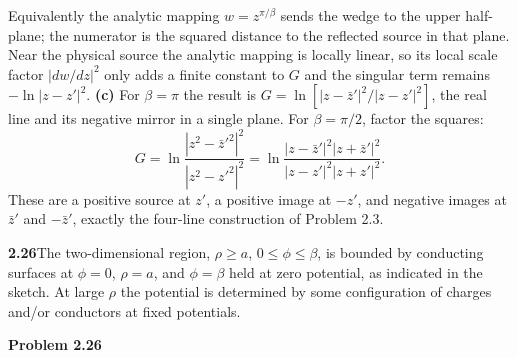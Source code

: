 Equivalently the analytic mapping $w=z^{\pi/\beta}$ sends the wedge
to the upper half-plane; the numerator is the squared distance to
the reflected source in that plane. Near the physical source the
analytic mapping is locally linear, so its local scale factor
$|dw/dz|^2$ only adds a finite constant to $G$ and the singular term
remains $-\ln|z-z'|^2$.
\textbf{(c)} For $\beta=\pi$ the result is
$G=\ln[|z-\bar z'|^2/|z-z'|^2]$, the real line and its negative
mirror in a single plane. For $\beta=\pi/2$, factor the squares:
\[
G=\ln\frac{|z^2-\bar z'^2|^2}{|z^2-z'^2|^2}
 =\ln\frac{|z-\bar z'|^2|z+\bar z'|^2}
              {|z-z'|^2|z+z'|^2}.
\]
These are a positive source at $z'$, a positive image at $-z'$,
and negative images at $\bar z'$ and $-\bar z'$, exactly the
four-line construction of Problem 2.3.

\par\bigskip
\noindent\textbf{2.26}\quad The two-dimensional region, $\rho\geq a$, $0\leq\phi\leq\beta$, is bounded by conducting surfaces at $\phi=0$, $\rho=a$, and $\phi=\beta$ held at zero potential, as indicated in the sketch. At large $\rho$ the potential is determined by some configuration of charges and/or conductors at fixed potentials.

\begin{center}
\par\vspace{0.5em}\textbf{Problem 2.26}
\end{center}

